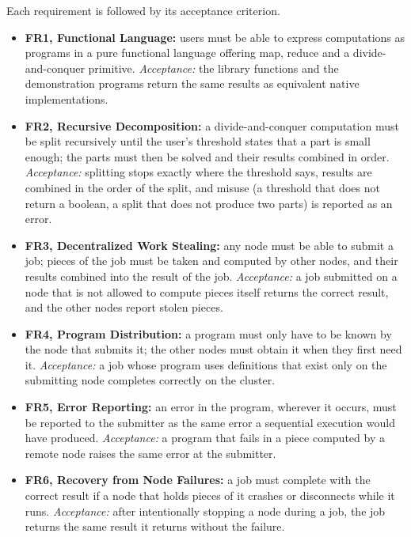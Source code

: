 \documentclass{scrartcl}
\begin{document}
Each requirement is followed by its acceptance criterion.
%
\begin{itemize}
  \item \textbf{FR1, Functional Language:} users must be able to express computations as programs in a pure functional language offering map, reduce and a divide-and-conquer primitive.
  \emph{Acceptance:} the library functions and the demonstration programs return the same results as equivalent native implementations.

  \item \textbf{FR2, Recursive Decomposition:} a divide-and-conquer computation must be split recursively until the user's threshold states that a part is small enough; the parts must then be solved and their results combined in order.
  \emph{Acceptance:} splitting stops exactly where the threshold says, results are combined in the order of the split, and misuse (a threshold that does not return a boolean, a split that does not produce two parts) is reported as an error.

  \item \textbf{FR3, Decentralized Work Stealing:} any node must be able to submit a job; pieces of the job must be taken and computed by other nodes, and their results combined into the result of the job.
  \emph{Acceptance:} a job submitted on a node that is not allowed to compute pieces itself returns the correct result, and the other nodes report stolen pieces.

  \item \textbf{FR4, Program Distribution:} a program must only have to be known by the node that submits it; the other nodes must obtain it when they first need it.
  \emph{Acceptance:} a job whose program uses definitions that exist only on the submitting node completes correctly on the cluster.

  \item \textbf{FR5, Error Reporting:} an error in the program, wherever it occurs, must be reported to the submitter as the same error a sequential execution would have produced.
  \emph{Acceptance:} a program that fails in a piece computed by a remote node raises the same error at the submitter.

  \item \textbf{FR6, Recovery from Node Failures:} a job must complete with the correct result if a node that holds pieces of it crashes or disconnects while it runs.
  \emph{Acceptance:} after intentionally stopping a node during a job, the job returns the same result it returns without the failure.


\end{itemize}
\end{document}

